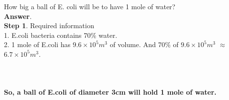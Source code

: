 \documentclass[11pt]{exam}
\begin{document}
\begin{questions}
\question
\label{Q14:E.coli and water}
How big a ball of E. coli will be to have 1 mole of water? \\
\textbf{Answer}. \\
\textbf{Step 1}. Required information \\
                1. E.coli bacteria contains 70$\%$ water. \\
                2. 1 mole of E.coli has $9.6\times10^{5}m^{3}$ of volume. And 70$\%$ of                 $9.6\times10^{5}m^{3}$ $\approx$ $6.7\times10^{5}m^{3}$. \\
                \\
 \\ \\
                 \textbf{So, a ball of E.coli of diameter 3cm will hold 1 mole of water.} \\ \\ \\ \\ \\ 



\end{questions}
\end{document}
